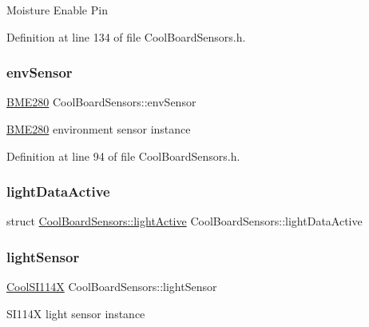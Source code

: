 Moisture Enable Pin 

Definition at line 134 of file Cool\+Board\+Sensors.\+h.

\mbox{\label{class_cool_board_sensors_a868e38985e9a2412829fa2790ca13e2e}} 
\subsubsection{\texorpdfstring{env\+Sensor}{envSensor}}
{\footnotesize\ttfamily \hyperlink{class_b_m_e280}{B\+M\+E280} Cool\+Board\+Sensors\+::env\+Sensor}

\hyperlink{class_b_m_e280}{B\+M\+E280} environment sensor instance 

Definition at line 94 of file Cool\+Board\+Sensors.\+h.

\mbox{\label{class_cool_board_sensors_ac4deb1cf41bac8b91c780c92fab00ba4}} 
\subsubsection{\texorpdfstring{light\+Data\+Active}{lightDataActive}}
{\footnotesize\ttfamily struct \hyperlink{struct_cool_board_sensors_1_1light_active}{Cool\+Board\+Sensors\+::light\+Active} Cool\+Board\+Sensors\+::light\+Data\+Active\hspace{0.3cm}{\ttfamily [private]}}

\mbox{\label{class_cool_board_sensors_ac711c27d0927eb5e73be77f092c48be0}} 
\subsubsection{\texorpdfstring{light\+Sensor}{lightSensor}}
{\footnotesize\ttfamily \hyperlink{class_cool_s_i114_x}{Cool\+S\+I114X} Cool\+Board\+Sensors\+::light\+Sensor}

S\+I114X light sensor instance 

